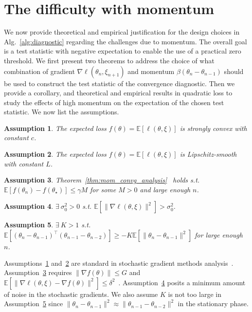\documentclass[conference]{IEEEtran}
\newcommand{\Ex}[1]{\mathbb{E}[ #1 ]}
\newtheorem{assumption}{Assumption}
\begin{document}
\section{The difficulty with momentum}\label{sec:momentum-stationarity}\label{sec:high_momentum_ip}

We now provide theoretical and empirical justification for the design choices in Alg.~\ref{alg:diagnostic} regarding the challenges due to momentum.
The overall goal is a test statistic with negative expectation to enable the use of a practical zero threshold. We first present two theorems to address the choice of what combination of gradient $\nabla \ell (\theta_n, \xi_{n+1})$ and momentum $\beta (\theta_n - \theta_{n-1})$ should be used to construct the test statistic of the convergence diagnostic. Then we provide a corollary, and theoretical and empirical results in quadratic loss to study the effects of high momentum on the expectation of the chosen test statistic.
We now list the assumptions.
\begin{assumption}
\label{assump:strcvx}
The expected loss $f(\theta) = \Ex{ \ell(\theta, \xi) }$ is strongly convex with constant $c$.
\end{assumption}

\begin{assumption}
\label{assump:Lsmooth}
The expected loss $f(\theta) = \Ex{ \ell(\theta, \xi) }$ is Lipschitz-smooth with constant $L$.
\end{assumption}

\begin{assumption}
\label{assump:Fbound}
Theorem~\ref{thm:mom_convg_analysis}~\cite{Report:Yang_arXiv16} holds s.t. $\Ex{ f(\theta_n) - f(\theta_\star) } \leq \gamma M$ for some $M > 0$ and large enough $n$. 
\end{assumption}

\begin{assumption}
\label{assump:min_noise} 
$\exists \ \sigma_0^2 > 0$ s.t. $\Ex{ \| \nabla \ell (\theta, \xi) \|^2 } > \sigma_0^2$.
\end{assumption}

\begin{assumption}
\label{assump:scaling}
$\exists \ K > 1$ s.t. $\Ex{ (\theta_n - \theta_{n-1})^\top (\theta_{n-1} - \theta_{n-2}) } \geq - K \Ex{ \| \theta_n - \theta_{n-1} \|^2 }$ for large enough $n$.
\end{assumption}

Assumptions~\ref{assump:strcvx} and~\ref{assump:Lsmooth} are standard in stochastic gradient methods analysis~\cite{Bach_NIPS13,Proc:Bach_NIPS11}. 
Assumption~\ref{assump:Fbound} requires $\| \nabla f(\theta) \| \leq G$ and $\Ex{ \| \nabla \ell(\theta, \xi) - \nabla f(\theta) \|^2 } \leq \delta^2$~\cite{Report:Yang_arXiv16}. 
Assumption~\ref{assump:min_noise} posits a minimum amount of noise in the stochastic gradients. 
We also assume $K$ is not too large in Assumption~\ref{assump:scaling} since $\| \theta_n - \theta_{n-1} \|^2 \approx \| \theta_{n-1} - \theta_{n-2} \|^2$ in the stationary phase.
\end{document}
